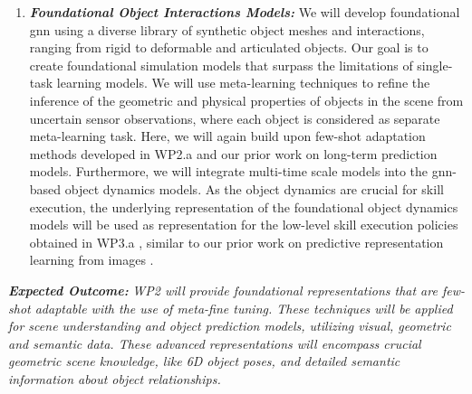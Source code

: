 \documentclass{erc-B2}
\begin{document}
\begin{enumerate}


\item \textit{\textbf{Foundational Object Interactions Models:}} %
We will develop foundational \gls*{gnn} using a diverse library of synthetic object meshes and interactions, ranging from rigid to deformable and articulated objects. Our goal is to create foundational simulation models that surpass the limitations of single-task learning models. We will use meta-learning techniques to refine the inference of the geometric and physical properties of objects in the scene from uncertain sensor observations, where each object is considered as separate meta-learning task. Here, we will again build upon few-shot adaptation methods developed in WP2.a and our prior work on long-term prediction models. 
Furthermore, we will integrate multi-time scale models \cite{shaj2023mts3} into the \gls*{gnn}-based object dynamics models. As the object dynamics are crucial for skill execution, the underlying representation of the foundational object dynamics models will be used as representation \cite{yang2023foundation} for the low-level skill execution policies obtained in WP3.a , similar to our prior work on predictive representation learning from images \cite{Becker2023archive}. 
\end{enumerate}
\textbf{\textit{Expected Outcome:}} \textit{WP2 will provide foundational representations that are few-shot adaptable with the use of meta-fine tuning.  These techniques will be applied for scene understanding and object prediction models, utilizing visual, geometric and semantic data. These advanced representations will encompass crucial geometric scene knowledge, like 6D object poses, and detailed semantic information about object relationships.}
\end{document}
